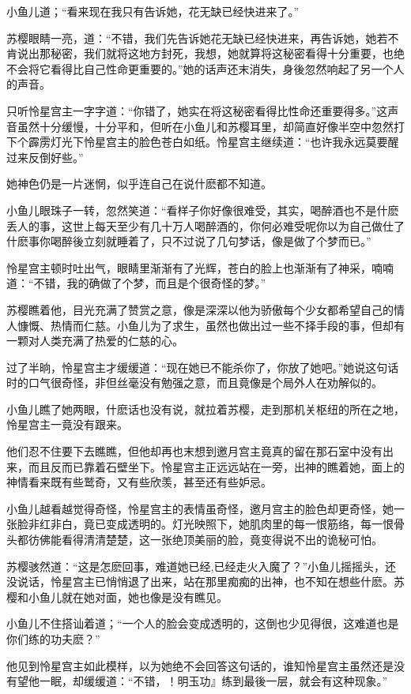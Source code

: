 \documentclass[12pt,oneside]{book}
\begin{document}
小鱼儿道；``看来现在我只有告诉她，花无缺已经快进来了。''

苏樱眼睛一亮，道：``不错，我们先告诉她花无缺已经快进来，再告诉她，她若不肯说出那秘密，我们就将这地方封死，我想，她就算将这秘密看得十分重要，也绝不会将它看得比自己性命更重要的。''她的话声还末消失，身後忽然响起了另一个人的声音。

只听怜星宫主一字字道：``你错了，她实在将这秘密看得比性命还重要得多。''这声音虽然十分缓慢，十分平和，但听在小鱼儿和苏樱耳里，却简直好像半空中忽然打下个霹雳灯光下怜星宫主的脸色苍白如纸。怜星宫主继续道：``也许我永远莫要醒过来反倒好些。''

她神色仍是一片迷惘，似乎连自己在说什麽都不知道。

小鱼儿眼珠子一转，忽然笑道：``看样子你好像很难受，其实，喝醉酒也不是什麽丢人的事，这世上每天至少有几十万人喝醉酒的，你何必难受呢你以为自己做仕了什麽事你喝醉後立刻就睡着了，只不过说了几句梦话，像是做了个梦而已。''

怜星宫主顿时吐出气，眼睛里渐渐有了光辉，苍白的脸上也渐渐有了神采，喃喃道：``不错，我的确做了个梦，而且是个很奇怪的梦。''

苏樱瞧着他，目光充满了赞赏之意，像是深深以他为骄傲每个少女都希望自己的情人慷慨、热情而仁慈。小鱼儿为了求生，虽然也做出过一些不择手段的事，但却有一颗对人类充满了热爱的仁慈的心。

过了半晌，怜星宫主才缓缓道：``现在她已不能杀你了，你放了她吧。''她说这句话时的口气很奇怪，非但丝毫没有勉强之意，而且竟像是个局外人在劝解似的。

小鱼儿瞧了她两眼，什麽话也没有说，就拉着苏樱，走到那机关枢纽的所在之地，怜星宫主一竟没有跟来。

他们忍不住要下去瞧瞧，但他却再也末想到邀月宫主竟真的留在那石室中没有出来，而且反而已靠着石壁坐下。怜星宫主正远远站在一旁，出神的瞧着她，面上的神情看来既有些鹫奇，又有些欣羡，甚至还有些妒忌。

小鱼儿越看越觉得奇怪，怜星宫主的表情虽奇怪，邀月宫主的脸色却更奇怪，她一张脸非红非白，竟已变成透明的。灯光映照下，她肌肉里的每一恨筋络，每一恨骨头都彷佛能看得清清楚楚，这一张绝顶美丽的脸，竟变得说不出的诡秘可怕。

苏樱骇然道：``这是怎麽回事，难道她已经,已经走火入魔了？''小鱼儿摇摇头，还没说话，怜星宫主已悄悄退了出来，站在那里痴痴的出神，也不知在想些什麽。苏樱和小鱼儿就在她对面，她也像是没有瞧见。

小鱼儿不住搭讪着道；``一个人的脸会变成透明的，这倒也少见得很，这难道也是你们练的功夫麽？''

他见到怜星宫主如此模样，以为她绝不会回答这句话的，谁知怜星宫主虽然还是没有望他一眠，却缓缓道：``不错，！明玉功』练到最後一层，就会有这种现象。''
\end{document}
